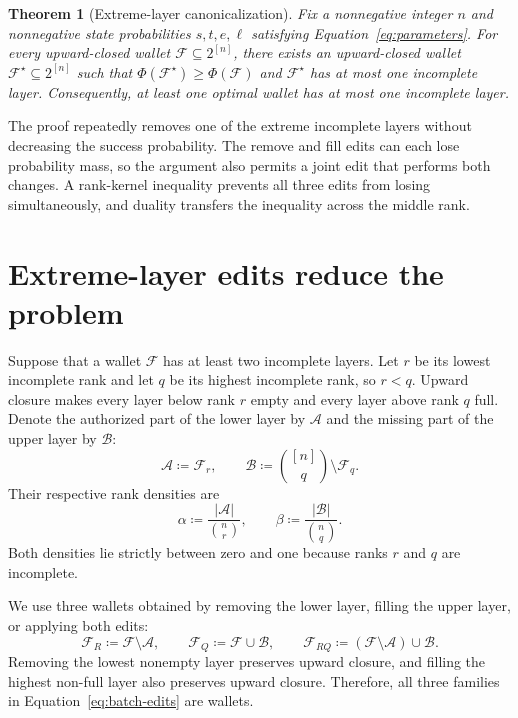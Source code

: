 \documentclass[11pt]{article}
\newtheorem{theorem}{Theorem}
\newcommand{\cF}{\ensuremath{\mathcal F}\xspace}
\newcommand{\cA}{\ensuremath{\mathcal A}\xspace}
\newcommand{\cB}{\ensuremath{\mathcal B}\xspace}
\begin{document}
\begin{theorem}[Extreme-layer canonicalization]\label{thm:canonicalization}
Fix a nonnegative integer $n$ and nonnegative state probabilities $s,t,e,\ell$ satisfying Equation~\eqref{eq:parameters}.
For every upward-closed wallet ${\cF\subseteq2^{[n]}}$, there exists an upward-closed wallet ${\cF^\star\subseteq2^{[n]}}$ such that ${\Phi(\cF^\star)\geq\Phi(\cF)}$ and $\cF^\star$ has at most one incomplete layer.
Consequently, at least one optimal wallet has at most one incomplete layer.
\end{theorem}

The proof repeatedly removes one of the extreme incomplete layers without decreasing the success probability.
The remove and fill edits can each lose probability mass, so the argument also permits a joint edit that performs both changes.
A rank-kernel inequality prevents all three edits from losing simultaneously, and duality transfers the inequality across the middle rank.

  \section{Extreme-layer edits reduce the problem}

Suppose that a wallet $\cF$ has at least two incomplete layers.
Let $r$ be its lowest incomplete rank and let $q$ be its highest incomplete rank, so ${r<q}$.
Upward closure makes every layer below rank $r$ empty and every layer above rank $q$ full.
Denote the authorized part of the lower layer by $\cA$ and the missing part of the upper layer by $\cB$:
\begin{equation*}
\cA\coloneqq\cF_r,
\qquad
\cB\coloneqq\binom{[n]}q\setminus\cF_q.
\end{equation*}
Their respective rank densities are
\begin{equation*}
\alpha\coloneqq\frac{|\cA|}{\binom nr},
\qquad
\beta\coloneqq\frac{|\cB|}{\binom nq}.
\end{equation*}
Both densities lie strictly between zero and one because ranks $r$ and $q$ are incomplete.

We use three wallets obtained by removing the lower layer, filling the upper layer, or applying both edits:
\begin{equation}
\cF_R\coloneqq\cF\setminus\cA,
\qquad
\cF_Q\coloneqq\cF\cup\cB,
\qquad
\cF_{RQ}\coloneqq(\cF\setminus\cA)\cup\cB.
\label{eq:batch-edits}
\end{equation}
Removing the lowest nonempty layer preserves upward closure, and filling the highest non-full layer also preserves upward closure.
Therefore, all three families in Equation~\eqref{eq:batch-edits} are wallets.
\end{document}
